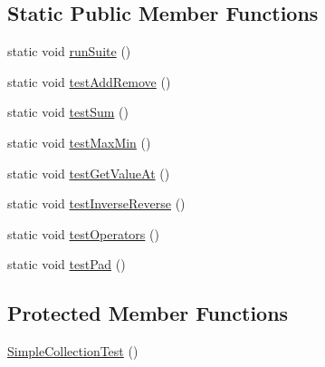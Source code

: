 \subsection*{Static Public Member Functions}
\begin{DoxyCompactItemize}
\item 
static void \hyperlink{classcryomesh_1_1common_1_1_simple_collection_test_aa79c9251cc90f5fb52774cccddfa3b96}{runSuite} ()
\item 
static void \hyperlink{classcryomesh_1_1common_1_1_simple_collection_test_a5497e957f4c59796388400eb01883035}{testAddRemove} ()
\item 
static void \hyperlink{classcryomesh_1_1common_1_1_simple_collection_test_a9cfeecaf8cbfc318d38a48c81ba61913}{testSum} ()
\item 
static void \hyperlink{classcryomesh_1_1common_1_1_simple_collection_test_a26c158f89bdc84f4cf1f1ed6874321d1}{testMaxMin} ()
\item 
static void \hyperlink{classcryomesh_1_1common_1_1_simple_collection_test_a47cfd0be3864fd8452d53bd0a2bc15ae}{testGetValueAt} ()
\item 
static void \hyperlink{classcryomesh_1_1common_1_1_simple_collection_test_aa591e7768584f7c8a3d99a62839f4883}{testInverseReverse} ()
\item 
static void \hyperlink{classcryomesh_1_1common_1_1_simple_collection_test_ae7f95badd9de7271bc0e746fbaa42706}{testOperators} ()
\item 
static void \hyperlink{classcryomesh_1_1common_1_1_simple_collection_test_aa77eb7323a6f46dc1f9fc47c03278f2b}{testPad} ()
\end{DoxyCompactItemize}
\subsection*{Protected Member Functions}
\begin{DoxyCompactItemize}
\item 
\hyperlink{classcryomesh_1_1common_1_1_simple_collection_test_ab40867505de8fe8abddc70027f491a04}{SimpleCollectionTest} ()
\end{DoxyCompactItemize}


